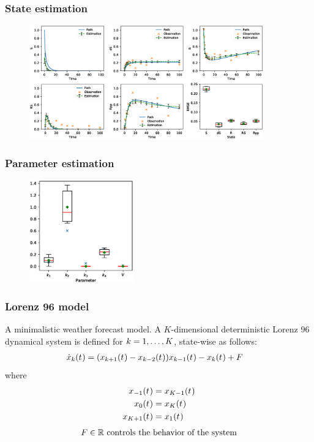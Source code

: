 \begin{frame}[t]
    \frametitle{State estimation}
    \begin{figure}
        \centering
        \includegraphics[width=0.9\textwidth]{graphics/protein-states-without-km-partial}
        \label{fig-protein-states-partial-without-km}
    \end{figure}
\end{frame}

\begin{frame}[t]
    \frametitle{Parameter estimation}
    \begin{figure}
        \centering
        \includegraphics[width=0.4\textwidth]{graphics/protein-parameters-without-km-partial}
        \label{fig-protein-parameters-partial-without-km}
    \end{figure}            
\end{frame}

\begin{frame}[t]
    \frametitle{Lorenz 96 model}
    A minimalistic weather forecast model.
    A $K$-dimensional deterministic Lorenz 96 dynamical system is defined for $k = 1,\dots,K$, state-wise as follows:
    \begin{align}
        \dot{x}_{k}(t_{})
         & = (x_{k+1}(t_{}) - x_{k-2}(t_{}))x_{k-1}(t_{}) - x_{k}(t_{}) + F
        \label{eq-lorenz-96-drift}
    \end{align}
    where
    \begin{align}
        x_{-1}(t_{}) & = x_{K-1}(t_{})
        \nonumber
        \\
        x_{0}(t_{}) & = x_{K}(t_{})
        \nonumber
        \\
        x_{K+1}(t_{}) & =x_{1}(t_{})        
        \nonumber
    \end{align}
    \begin{align}
        F \in \mathbb{R} \text{ controls the behavior of the system}
    \end{align}
\end{frame}

